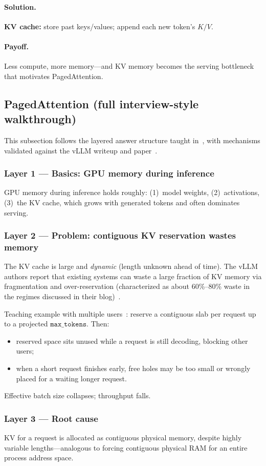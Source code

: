 \documentclass[11pt,a4paper]{article}
\newcommand{\layer}[1]{\paragraph{#1.}}
\newcommand{\solution}{\layer{Solution}}
\newcommand{\payoff}{\layer{Payoff}}
\begin{document}
\solution
\textbf{KV cache:} store past keys/values; append each new token's \(K/V\).

\payoff
Less compute, more memory---and KV memory becomes the serving bottleneck that motivates PagedAttention.

\subsection{PagedAttention (full interview-style walkthrough)}
\label{sec:paged}

This subsection follows the layered answer structure taught in~\cite{vizuara2026paged}, with mechanisms validated against the vLLM writeup and paper~\cite{kwon2023vllm,vllmblog2023}.

\subsubsection*{Layer 1 --- Basics: GPU memory during inference}
GPU memory during inference holds roughly:
(1)~model weights,
(2)~activations,
(3)~the KV cache, which grows with generated tokens and often dominates serving.

\subsubsection*{Layer 2 --- Problem: contiguous KV reservation wastes memory}
The KV cache is large and \emph{dynamic} (length unknown ahead of time).
The vLLM authors report that existing systems can waste a large fraction of KV memory via fragmentation and over-reservation (characterized as about 60\%--80\% waste in the regimes discussed in their blog)~\cite{vllmblog2023}.

Teaching example with multiple users~\cite{vizuara2026paged}:
reserve a contiguous slab per request up to a projected \(\texttt{max\_tokens}\).
Then:
\begin{itemize}[leftmargin=*]
  \item reserved space sits unused while a request is still decoding, blocking other users;
  \item when a short request finishes early, free holes may be too small or wrongly placed for a waiting longer request.
\end{itemize}
Effective batch size collapses; throughput falls.

\subsubsection*{Layer 3 --- Root cause}
KV for a request is allocated as contiguous physical memory, despite highly variable lengths---analogous to forcing contiguous physical RAM for an entire process address space.
\end{document}
